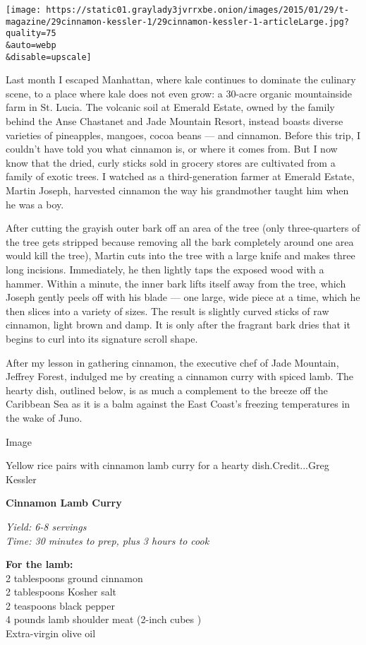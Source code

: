 \texttt{[image: https://static01.graylady3jvrrxbe.onion/images/2015/01/29/t-magazine/29cinnamon-kessler-1/29cinnamon-kessler-1-articleLarge.jpg?quality=75\\\&auto=webp\\\&disable=upscale]}

Last month I escaped Manhattan, where kale continues to dominate the
culinary scene, to a place where kale does not even grow: a 30-acre
organic mountainside farm in St. Lucia. The volcanic soil at Emerald
Estate, owned by the family behind the Anse Chastanet and Jade Mountain
Resort, instead boasts diverse varieties of pineapples, mangoes, cocoa
beans --- and cinnamon. Before this trip, I couldn't have told you what
cinnamon is, or where it comes from. But I now know that the dried,
curly sticks sold in grocery stores are cultivated from a family of
exotic trees. I watched as a third-generation farmer at Emerald Estate,
Martin Joseph, harvested cinnamon the way his grandmother taught him
when he was a boy.

After cutting the grayish outer bark off an area of the tree (only
three-quarters of the tree gets stripped because removing all the bark
completely around one area would kill the tree), Martin cuts into the
tree with a large knife and makes three long incisions. Immediately, he
then lightly taps the exposed wood with a hammer. Within a minute, the
inner bark lifts itself away from the tree, which Joseph gently peels
off with his blade --- one large, wide piece at a time, which he then
slices into a variety of sizes. The result is slightly curved sticks of
raw cinnamon, light brown and damp. It is only after the fragrant bark
dries that it begins to curl into its signature scroll shape.

After my lesson in gathering cinnamon, the executive chef of Jade
Mountain, Jeffrey Forest, indulged me by creating a cinnamon curry with
spiced lamb. The hearty dish, outlined below, is as much a complement to
the breeze off the Caribbean Sea as it is a balm against the East
Coast's freezing temperatures in the wake of Juno.

Image

Yellow rice pairs with cinnamon lamb curry for a hearty
dish.Credit...Greg Kessler

\textbf{Cinnamon Lamb Curry}

\emph{Yield: 6-8 servings}\\
\emph{Time: 30 minutes to prep, plus 3 hours to cook}

\textbf{For the lamb:}\\
2 tablespoons ground cinnamon\\
2 tablespoons Kosher salt\\
2 teaspoons black pepper\\
4 pounds lamb shoulder meat (2-inch cubes )\\
Extra-virgin olive oil


